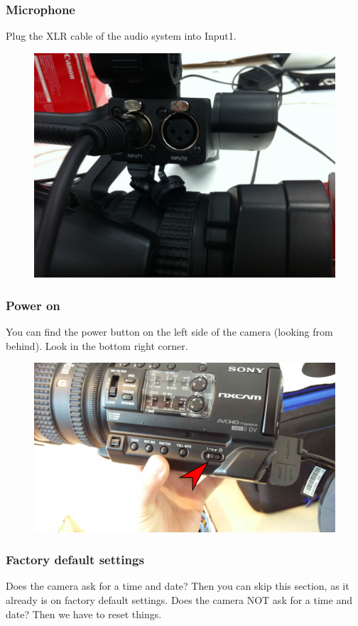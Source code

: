 \documentclass{article}
\begin{document}
\subsubsection{Microphone}
Plug the XLR cable of the audio system into Input1.

\begin{figure}[H]
  \centering
\includegraphics[width = 120mm]{sony_connect_xlr.jpg}
\end{figure}

\subsubsection{Power on}
You can find the power button on the left side of the camera (looking from behind). Look in the bottom right corner.

\begin{figure}[H]
  \centering
\includegraphics[width = 120mm]{Sony03.jpg}
\end{figure}

\subsubsection{Factory default settings}
Does the camera ask for a time and date? Then you can skip this section, as it already is on factory default settings.
Does the camera NOT ask for a time and date? Then we have to reset things.
\end{document}
